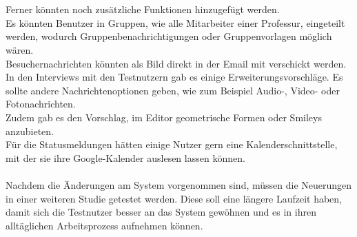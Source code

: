 % 
% 
% 
\\
\\
Ferner könnten noch zusätzliche Funktionen hinzugefügt werden.
\\
Es könnten Benutzer in Gruppen, wie \bspw alle Mitarbeiter einer Professur, eingeteilt werden, wodurch Gruppenbenachrichtigungen oder Gruppenvorlagen möglich wären.
\\
Besuchernachrichten könnten als Bild direkt in der Email mit verschickt werden.
\\
In den Interviews mit den Testnutzern gab es einige Erweiterungsvorschläge.
Es sollte andere Nachrichtenoptionen geben, wie zum Beispiel Audio-, Video- oder Fotonachrichten.
\\
Zudem gab es den Vorschlag, im Editor geometrische Formen oder Smileys anzubieten.
\\
Für die Statusmeldungen hätten einige Nutzer gern eine Kalenderschnittstelle, mit der sie ihre Google-Kalender auslesen lassen können.
% 
% 
% 
% 
\\
\\
Nachdem die Änderungen am System vorgenommen sind, müssen die Neuerungen in einer weiteren Studie getestet werden.
Diese soll eine längere Laufzeit haben, damit sich die Testnutzer besser an das System gewöhnen und es in ihren alltäglichen Arbeitsprozess aufnehmen können.
